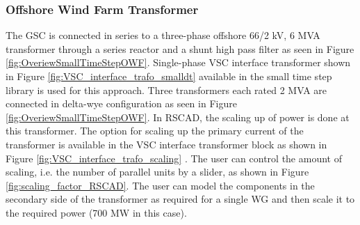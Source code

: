 \subsubsection{Offshore Wind Farm Transformer}\label{scaling_OWF}
The \gls{GSC} is connected in series to a three-phase offshore 66/2 kV, 6 MVA transformer through a series reactor and a shunt high pass filter as seen in Figure \ref{fig:OveriewSmallTimeStepOWF}. Single-phase \gls{VSC} interface transformer shown in Figure \ref{fig:VSC_interface_trafo_smalldt} available in the small time step library is used for this approach. Three transformers each rated 2 MVA are connected in delta-wye configuration as seen in Figure \ref{fig:OveriewSmallTimeStepOWF}. In RSCAD, the scaling up of power is done at this transformer. The option for scaling up the primary current of the transformer is available in the \gls{VSC} interface transformer block as shown in Figure \ref{fig:VSC_interface_trafo_scaling} \cite{rtds_tech}. The user can control the amount of scaling, i.e. the number of parallel units by a slider, as shown in Figure \ref{fig:scaling_factor_RSCAD}. The user can model the components in the secondary side of the transformer as required for a single \gls{WG} and then scale it to the required power (700 MW in this case).

